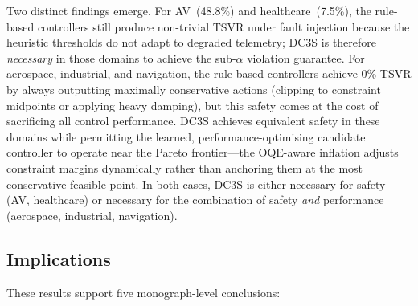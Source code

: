 Two distinct findings emerge.  For AV~(48.8\%) and healthcare~(7.5\%),
the rule-based controllers still produce non-trivial TSVR under fault
injection because the heuristic thresholds do not adapt to degraded
telemetry; DC3S is therefore \emph{necessary} in those domains to achieve
the sub-$\alpha$ violation guarantee.  For aerospace, industrial, and
navigation, the rule-based controllers achieve 0\% TSVR by always
outputting maximally conservative actions (clipping to constraint
midpoints or applying heavy damping), but this safety comes at the cost
of sacrificing all control performance.  DC3S achieves equivalent safety
in these domains while permitting the learned, performance-optimising
candidate controller to operate near the Pareto frontier---the
OQE-aware inflation adjusts constraint margins dynamically rather than
anchoring them at the most conservative feasible point.  In both cases,
DC3S is either necessary for safety (AV, healthcare) or necessary for
the combination of safety \emph{and} performance (aerospace, industrial,
navigation).

\subsection{Implications}

These results support five monograph-level conclusions:

